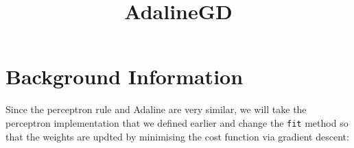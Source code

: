 \documentclass[11pt]{article}
\title{AdalineGD}
\begin{document}
    
    
    \maketitle
    
    

    
    \section{Background Information}\label{background-information}

Since the perceptron rule and Adaline are very similar, we will take the
perceptron implementation that we defined earlier and change the
\texttt{fit} method so that the weights are updted by minimising the
cost function via gradient descent:
\end{document}
